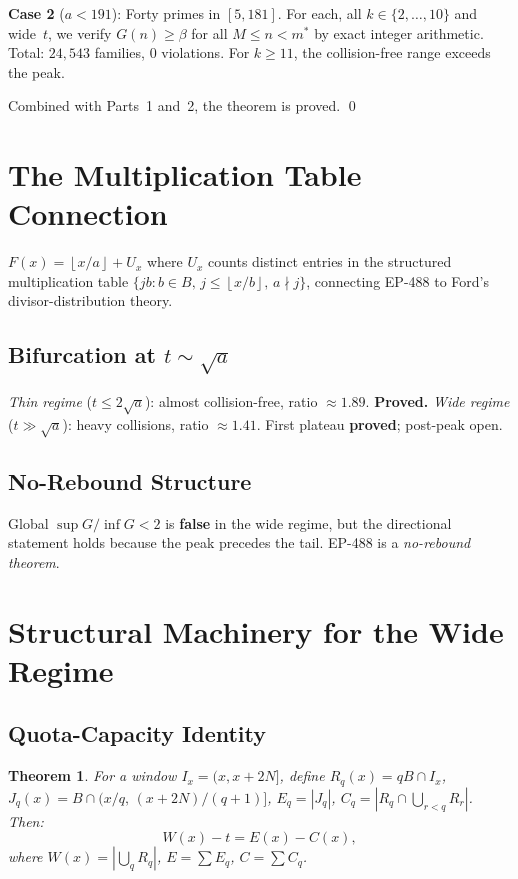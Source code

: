 \documentclass[11pt,a4paper]{article}
\newtheorem{theorem}{Theorem}[section]
\theoremstyle{definition}
\newcommand{\floor}[1]{\left\lfloor #1 \right\rfloor}
\begin{document}
\textbf{Case 2} ($a < 191$): Forty primes in $[5, 181]$. For each, all
$k \in \{2, \ldots, 10\}$ and wide~$t$, we verify $G(n) \geq \beta$ for
all $M \leq n < m^*$ by exact integer arithmetic. Total: $24{,}543$ families,
$0$ violations. For $k \geq 11$, the collision-free range exceeds the peak.

Combined with Parts~1 and~2, the theorem is proved. \qed

\section{The Multiplication Table Connection}

$F(x) = \floor{x/a} + U_x$ where $U_x$ counts distinct entries in the
structured multiplication table $\{jb : b \in B,\, j \leq \floor{x/b},\,
a \nmid j\}$, connecting EP-488 to Ford's divisor-distribution theory.

\subsection{Bifurcation at $t \sim \sqrt{a}$}

\emph{Thin regime} ($t \leq 2\sqrt{a}$): almost collision-free, ratio
$\approx 1.89$. \textbf{Proved.} \emph{Wide regime} ($t \gg \sqrt{a}$):
heavy collisions, ratio $\approx 1.41$. First plateau \textbf{proved};
post-peak open.

\subsection{No-Rebound Structure}

Global $\sup G/\inf G < 2$ is \textbf{false} in the wide regime, but the
directional statement holds because the peak precedes the tail. EP-488 is a
\emph{no-rebound theorem}.

\section{Structural Machinery for the Wide Regime}

\subsection{Quota-Capacity Identity}

\begin{theorem}\label{thm:qci}
For a window $I_x = (x, x+2N]$, define $R_q(x) = qB \cap I_x$,
$J_q(x) = B \cap (x/q,\, (x+2N)/(q+1)]$, $E_q = |J_q|$,
$C_q = |R_q \cap \bigcup_{r<q} R_r|$. Then:
\[
\boxed{W(x) - t = E(x) - C(x),}
\]
where $W(x) = |\bigcup_q R_q|$, $E = \sum E_q$, $C = \sum C_q$.
\end{theorem}
\end{document}

